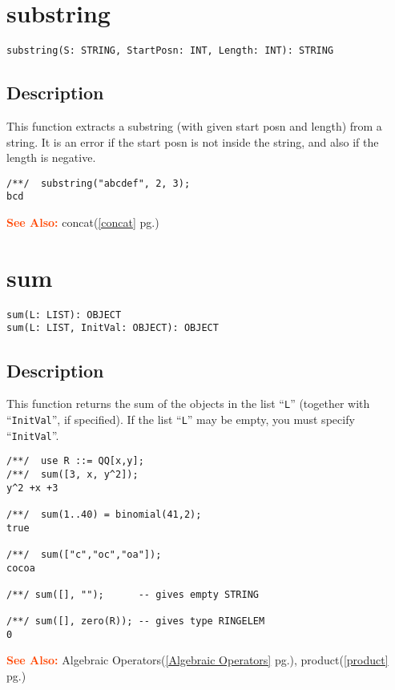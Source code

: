 \documentclass[a4paper]{mybook}
\newenvironment{command}{}{} %
\newcommand\SeeAlso{\par\textcolor{OrangeRed}{\textbf{\large See Also: }}}
\begin{document}
\section{substring}
\label{substring}
\begin{command} %


\begin{Verbatim}[label=syntax, rulecolor=\color{MidnightBlue},
frame=single]
substring(S: STRING, StartPosn: INT, Length: INT): STRING
\end{Verbatim}


\subsection*{Description}

This function extracts a substring (with given start posn and length)
from a string.  It is an error if the start posn is not inside the string,
and also if the length is negative.
\begin{Verbatim}[label=example, rulecolor=\color{PineGreen}, frame=single]
/**/  substring("abcdef", 2, 3);
bcd
\end{Verbatim}


\SeeAlso %
  concat(\ref{concat} pg.\pageref{concat})
\end{command} %

\section{sum}
\label{sum}
\begin{command} %


\begin{Verbatim}[label=syntax, rulecolor=\color{MidnightBlue},
frame=single]
sum(L: LIST): OBJECT
sum(L: LIST, InitVal: OBJECT): OBJECT
\end{Verbatim}


\subsection*{Description}

This function returns the sum of the objects in the list ``\verb&L&'' (together
with ``\verb&InitVal&'', if specified).  If the list ``\verb&L&'' may be empty,
you must specify ``\verb&InitVal&''.
\begin{Verbatim}[label=example, rulecolor=\color{PineGreen}, frame=single]
/**/  use R ::= QQ[x,y];
/**/  sum([3, x, y^2]);
y^2 +x +3

/**/  sum(1..40) = binomial(41,2);
true

/**/  sum(["c","oc","oa"]);
cocoa

/**/ sum([], "");      -- gives empty STRING

/**/ sum([], zero(R)); -- gives type RINGELEM
0
\end{Verbatim}


\SeeAlso %
  Algebraic Operators(\ref{Algebraic Operators} pg.\pageref{Algebraic Operators}), 
    product(\ref{product} pg.\pageref{product})
\end{command} %
\end{document}
